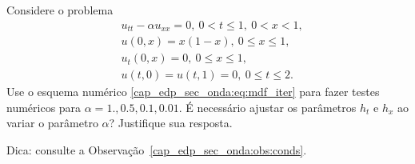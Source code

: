 \begin{exer}
  Considere o problema
  \begin{subequations}
    \begin{align}
      &u_{tt} - \alpha u_{xx} = 0, ~0 < t \leq 1, ~0< x < 1,\\
      &u(0,x) = x(1-x), ~0\leq x \leq 1,\\
      &u_t(0,x) = 0, ~0\leq x \leq 1,\\
      &u(t,0) = u(t,1) = 0, ~0\leq t \leq 2.
    \end{align}
  \end{subequations}
  Use o esquema numérico \eqref{cap_edp_sec_onda:eq:mdf_iter} para fazer testes numéricos para $\alpha = 1., 0.5, 0.1, 0.01$. É necessário ajustar os parâmetros $h_t$ e $h_x$ ao variar o parâmetro $\alpha$? Justifique sua resposta.
\end{exer}
\begin{resp}
  Dica: consulte a Observação~\ref{cap_edp_sec_onda:obs:conds}.
\end{resp}